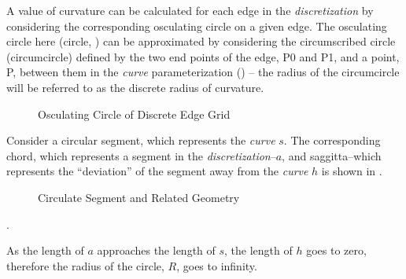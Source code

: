 A value of curvature can be calculated for each edge in the \textit{discretization} by considering the corresponding osculating circle on a given edge. The osculating circle here (circle, ) can be approximated by considering the circumscribed circle (circumcircle) \cite{casey1888} defined by the two end points of the edge, P0 and P1, and a point, P, between them in the \textit{curve} parameterization () -- the radius of the circumcircle will be referred to as the discrete radius of curvature.

\begin{figure}[h!]
  \caption{\label{fig:CircumscribedCircle} Osculating Circle of Discrete Edge Grid}
\end{figure}


Consider a circular segment, which represents the \textit{curve} $s$.  The corresponding chord, which represents a segment in the \textit{discretization}--$a$, and saggitta--which represents the ``deviation'' of the segment away from the \textit{curve} $h$ is shown in .

\begin{figure}
  \caption{\label{fig:CircleGeometry} Circulate Segment and Related Geometry \cite{weissteineSagitta}}
\end{figure}.

\begin{theorem}
As the length of $a$ approaches the length of $s$, the length of $h$ goes 
to zero, therefore the radius of the circle, $R$, goes to infinity.  
\end{theorem}

